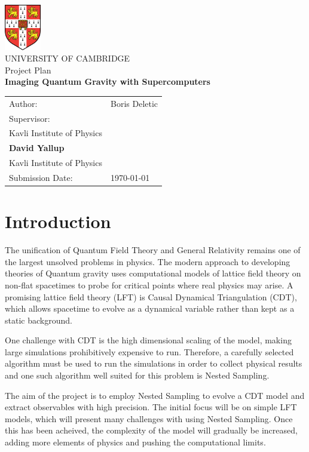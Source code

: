 \documentclass[a4paper]{article}
\newcommand{\getAuthor}{Boris Deletic}
\newcommand{\getDoctype}{Project Plan}
\newcommand{\getTitle}{Imaging Quantum Gravity with Supercomputers}
\newcommand{\getUniversity}{University of Cambridge}
\newcommand{\getSupervisor}{\textbf{Will Barker}\\
Kavli Institute of Physics\\[1em] 
\textbf{David Yallup}\\ 
Kavli Institute of Physics}
\newcommand{\getSubmissionDate}{\today}
\begin{document}
\begin{titlepage} 
    \centering 
    \includegraphics[height=20mm]{logo} {%
    \vspace*{20mm} }\\
    {\large\MakeUppercase{\getUniversity{}}}\\ 
    \vspace{20mm}
    {\Large \getDoctype{}}\\
    \vspace{15mm}
    {\huge\bfseries \getTitle{}}\\
    \vspace{15mm} 
    \begin{tabular}{l l} 
        Author: & \getAuthor{} \\[1em] 
        Supervisor: & \pbox[t]{5cm}{\getSupervisor{}} \\ 
        Submission Date: & \getSubmissionDate{} \\
    \end{tabular} 
  \end{titlepage}

  \section{Introduction}
        The unification of Quantum Field Theory and General Relativity remains one of the largest unsolved problems in physics. The modern approach to developing theories of Quantum gravity uses computational models of lattice field theory on non-flat spacetimes to probe for critical points where real physics may arise. A promising lattice field theory (LFT) is Causal Dynamical Triangulation (CDT), which allows spacetime to evolve as a dynamical variable rather than kept as a static background.

    One challenge with CDT is the high dimensional scaling of the model, making large simulations prohibitively expensive to run. Therefore, a carefully selected algorithm must be used to run the simulations in order to collect physical results and one such algorithm well suited for this problem is Nested Sampling\cite{1}.

    The aim of the project is to employ Nested Sampling to evolve a CDT model and extract observables with high precision. The initial focus will be on simple LFT models, which will present many challenges with using Nested Sampling. Once this has been acheived, the complexity of the model will gradually be increased, adding more elements of physics and pushing the computational limits.
\end{document}
